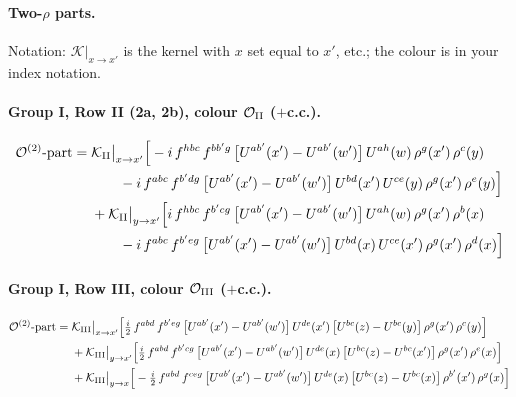 \documentclass[10pt]{article}
\numberwithin{equation}{section}
\newcommand{\OO}{\mathcal O}
\newcommand{\KK}{\mathcal K}
\begin{document}
\paragraph{Two-$\rho$ parts.} Notation: $\KK|_{x\to x'}$ is the kernel with $x$ set equal to $x'$, etc.; the colour is in your index notation.
\paragraph{Group I, Row II (2a, 2b), colour $\OO_{\rm II}$ ($+$c.c.).}
\begin{align}
\OO^{(2)}\text{-part}={}&\KK_{\rm II}\big|_{x\to x'}\Big[-i\,f^{hbc}\,f^{bb'g}\,\big[U^{ab'}(x')-U^{ab'}(w')\big]\,U^{ah}(w)\,\rho^{g}(x')\,\rho^{c}(y)\notag\\
&\qquad-i\,f^{abc}\,f^{b'dg}\,\big[U^{ab'}(x')-U^{ab'}(w')\big]\,U^{bd}(x')\,U^{ce}(y)\,\rho^{g}(x')\,\rho^{e}(y)\Big]\notag\\
&+\KK_{\rm II}\big|_{y\to x'}\Big[i\,f^{hbc}\,f^{b'cg}\,\big[U^{ab'}(x')-U^{ab'}(w')\big]\,U^{ah}(w)\,\rho^{g}(x')\,\rho^{b}(x)\notag\\
&\qquad-i\,f^{abc}\,f^{b'eg}\,\big[U^{ab'}(x')-U^{ab'}(w')\big]\,U^{bd}(x)\,U^{ce}(x')\,\rho^{g}(x')\,\rho^{d}(x)\Big]
\end{align}
\paragraph{Group I, Row III, colour $\OO_{\rm III}$ ($+$c.c.).}
\begin{align}
\OO^{(2)}\text{-part}={}&\KK_{\rm III}\big|_{x\to x'}\Big[\tfrac{i}{2}\,f^{abd}\,f^{b'eg}\,\big[U^{ab'}(x')-U^{ab'}(w')\big]\,U^{de}(x')\,\big[U^{bc}(z)-U^{bc}(y)\big]\,\rho^{g}(x')\,\rho^{c}(y)\Big]\notag\\
&+\KK_{\rm III}\big|_{y\to x'}\Big[\tfrac{i}{2}\,f^{abd}\,f^{b'cg}\,\big[U^{ab'}(x')-U^{ab'}(w')\big]\,U^{de}(x)\,\big[U^{bc}(z)-U^{bc}(x')\big]\,\rho^{g}(x')\,\rho^{e}(x)\Big]\notag\\
&+\KK_{\rm III}\big|_{y\to x}\Big[-\tfrac{i}{2}\,f^{abd}\,f^{ceg}\,\big[U^{ab'}(x')-U^{ab'}(w')\big]\,U^{de}(x)\,\big[U^{bc}(z)-U^{bc}(x)\big]\,\rho^{b'}(x')\,\rho^{g}(x)\Big]
\end{align}
\end{document}
